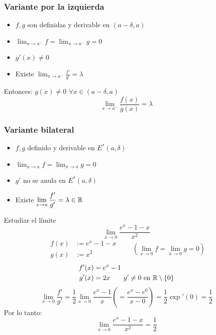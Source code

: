 \documentclass[11pt,a4paper]{article}
\begin{document}
\subsubsection*{Variante por la izquierda}

\begin{itemize}
  \item[--] $f,g$ son definidas y derivable en $(a-\delta,a)$
  \item[--] $\displaystyle\lim_{x\to a^-}f=\lim_{x\to a^-}g=0$
  \item[--] $g'(x)\neq 0$
  \item[--] Existe $\displaystyle\lim_{x\to a^-}\frac{f'}{g'}=\lambda$
\end{itemize}
Entonces: $g(x)\neq 0$ $\forall x\in(a-\delta,a)$
\[
  \lim_{x\to a^-}\frac{f(x)}{g(x)}=\lambda
\]

\subsubsection*{Variante bilateral}

\begin{itemize}
  \item[--] $f,g$ definido y derivable en $E^*(a,\delta)$
  \item[--] $\displaystyle\lim_{x\to a}f=\lim_{x\to a}g=0$
  \item[--] $g'$ no se anula en $E^*(a,\delta)$
  \item[--] Existe $\displaystyle\lim_{x\to a}\frac{f'}{g'}=\lambda\in\mathbb{R}$
\end{itemize}

\begin{ejemplo}
  Estudiar el límite
  \[
    \lim_{x\to 0}\frac{e^x-1-x}{x^2}
  \]
  \[
    \left.\begin{aligned}
      f(x)&:=e^x-1-x\\
      g(x)&:=x^2
    \end{aligned}\right.
    \qquad\left(\lim_{x\to 0}f=\lim_{x\to 0}g=0\right)
  \]
  \begin{align*}
    f'(x)&=e^x-1\\
    g'(x)&=2x \qquad g'\neq 0 \text{ en } \mathbb{R}\setminus\{0\}
  \end{align*}
  \[
    \lim_{x\to 0}\frac{f'}{g'}=\frac12\lim_{x\to 0}\frac{e^x-1}{x}
    \left(=\frac{e^x-e^0}{x-0}\right)=\frac12\exp'(0)=\frac12
  \]
  Por lo tanto:
  \[
    \lim_{x\to 0}\frac{e^x-1-x}{x^2}=\frac12
  \]
\end{ejemplo}

\end{document}
